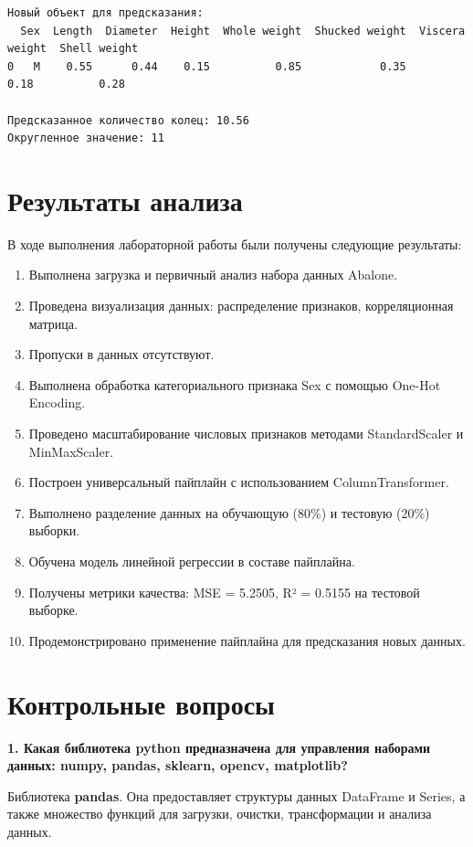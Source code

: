 \begin{verbatim}
Новый объект для предсказания:
  Sex  Length  Diameter  Height  Whole weight  Shucked weight  Viscera weight  Shell weight
0   M    0.55      0.44    0.15          0.85            0.35            0.18          0.28

Предсказанное количество колец: 10.56
Округленное значение: 11
\end{verbatim}

\section{Результаты анализа}

В ходе выполнения лабораторной работы были получены следующие результаты:

\begin{enumerate}
    \item Выполнена загрузка и первичный анализ набора данных Abalone.
    \item Проведена визуализация данных: распределение признаков, корреляционная матрица.
    \item Пропуски в данных отсутствуют.
    \item Выполнена обработка категориального признака Sex с помощью One-Hot Encoding.
    \item Проведено масштабирование числовых признаков методами StandardScaler и MinMaxScaler.
    \item Построен универсальный пайплайн с использованием ColumnTransformer.
    \item Выполнено разделение данных на обучающую (80\%) и тестовую (20\%) выборки.
    \item Обучена модель линейной регрессии в составе пайплайна.
    \item Получены метрики качества: MSE = 5.2505, R² = 0.5155 на тестовой выборке.
    \item Продемонстрировано применение пайплайна для предсказания новых данных.
\end{enumerate}

\section{Контрольные вопросы}

\textbf{1. Какая библиотека python предназначена для управления наборами данных: numpy, pandas, sklearn, opencv, matplotlib?}

Библиотека \textbf{pandas}. Она предоставляет структуры данных DataFrame и Series, а также множество функций для загрузки, очистки, трансформации и анализа данных.

